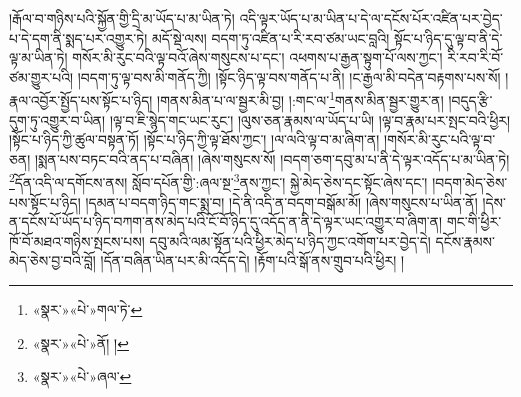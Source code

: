 །རྒོལ་བ་གཉིས་པའི་སྐྱོན་གྱི་དྲི་མ་ཡོད་པ་མ་ཡིན་ཏེ། འདི་ལྟར་ཡོད་པ་མ་ཡིན་པ་དེ་ལ་དངོས་པོར་འཛིན་པར་བྱེད་པ་དེ་དག་ནི་སྨད་པར་འགྱུར་ཏེ། མདོ་སྡེ་ལས། བདག་ཏུ་འཛིན་པ་རི་རབ་ཙམ་ཡང་བླའི། སྟོང་པ་ཉིད་དུ་ལྟ་བ་ནི་དེ་ལྟ་མ་ཡིན་ཏེ། གསོར་མི་རུང་བའི་ལྟ་བའོ་ཞེས་གསུངས་པ་དང་། འཕགས་པ་རྒྱན་སྟུག་པོ་ལས་ཀྱང་། རི་རབ་རི་བོ་ཙམ་གྱུར་པའི། །བདག་ཏུ་ལྟ་བས་མི་གནོད་ཀྱི། །སྟོང་ཉིད་ལྟ་བས་གནོད་པ་ནི། །ང་རྒྱལ་མི་བདེན་བརྟགས་པས་སོ། །རྣལ་འབྱོར་སྤྱོད་པས་སྟོང་པ་ཉིད། །གནས་མིན་པ་ལ་སྦྱར་མི་བྱ། །:གང་ལ་\footnote{«སྣར་»«པེ་»གལ་ཏེ་}གནས་མིན་སྦྱར་གྱུར་ན། །བདུད་རྩི་དུག་ཏུ་འགྱུར་བ་ཡིན། །ལྟ་བ་ཇི་སྙེད་གང་ཡང་རུང་། །ལུས་ཅན་རྣམས་ལ་ཡོད་པ་ཡི། །ལྟ་བ་རྣམ་པར་སྤང་བའི་ཕྱིར། །སྟོང་པ་ཉིད་ཀྱི་ཚུལ་བསྟན་ཏོ། །སྟོང་པ་ཉིད་ཀྱི་ལྟ་ཐོས་ཀྱང་། །ལ་ལའི་ལྟ་བ་མ་ཞིག་ན། །གསོར་མི་རུང་པའི་ལྟ་བ་ཅན། །སྨན་པས་བཏང་བའི་ནད་པ་བཞིན། །ཞེས་གསུངས་སོ། །བདག་ཅག་དབུ་མ་པ་ནི་དེ་ལྟར་འདོད་པ་མ་ཡིན་ཏེ། \footnote{«སྣར་»«པེ་»ནོ། ། }དོན་འདི་ལ་དགོངས་ནས། སློབ་དཔོན་གྱི་:ཞལ་སྔ་\footnote{«སྣར་»«པེ་»ཞལ་}ནས་ཀྱང་། སྐྱེ་མེད་ཅེས་དང་སྟོང་ཞེས་དང་། །བདག་མེད་ཅེས་པས་སྟོང་པ་ཉིད། །དམན་པ་བདག་ཉིད་གང་སྨྲ་བ། །དེ་ནི་འདི་ན་བདག་བསྒོམ་མོ། །ཞེས་གསུངས་པ་ཡིན་ནོ། །དེས་ན་དངོས་པོ་ཡོད་པ་ཉིད་བཀག་ནས་མེད་པའི་ངོ་བོ་ཉིད་དུ་འདོད་ན་ནི་དེ་ལྟར་ཡང་འགྱུར་བ་ཞིག་ན། གང་གི་ཕྱིར་ཁོ་བོ་མཐའ་གཉིས་སྤངས་པས། དབུ་མའི་ལམ་སྟོན་པའི་ཕྱིར་མེད་པ་ཉིད་ཀྱང་འགོག་པར་བྱེད་དེ། དངོས་རྣམས་མེད་ཅེས་བྱ་བའི་བློ། །དོན་བཞིན་ཡིན་པར་མི་འདོད་དེ། །རྟོག་པའི་སྒོ་ནས་གྲུབ་པའི་ཕྱིར། །
